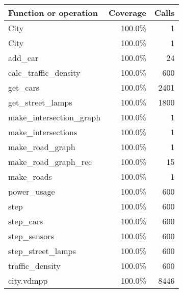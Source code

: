 \documentclass[a4paper]{article}
\begin{document}
\begin{longtable}{|l|r|r|}
\hline
Function or operation & Coverage & Calls \\
\hline
\hline
City & 100.0\% & 1 \\
\hline
City & 100.0\% & 1 \\
\hline
add\_car & 100.0\% & 24 \\
\hline
calc\_traffic\_density & 100.0\% & 600 \\
\hline
get\_cars & 100.0\% & 2401 \\
\hline
get\_street\_lamps & 100.0\% & 1800 \\
\hline
make\_intersection\_graph & 100.0\% & 1 \\
\hline
make\_intersections & 100.0\% & 1 \\
\hline
make\_road\_graph & 100.0\% & 1 \\
\hline
make\_road\_graph\_rec & 100.0\% & 15 \\
\hline
make\_roads & 100.0\% & 1 \\
\hline
power\_usage & 100.0\% & 600 \\
\hline
step & 100.0\% & 600 \\
\hline
step\_cars & 100.0\% & 600 \\
\hline
step\_sensors & 100.0\% & 600 \\
\hline
step\_street\_lamps & 100.0\% & 600 \\
\hline
traffic\_density & 100.0\% & 600 \\
\hline
\hline
city.vdmpp & 100.0\% & 8446 \\
\hline
\end{longtable}
\end{document}
